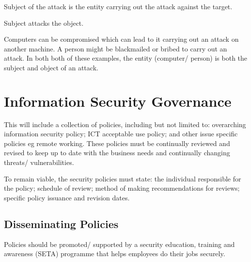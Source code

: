 Subject of the attack is the entity carrying out the attack against the target. 

Subject attacks the object.

Computers can be compromised which can lead to it carrying out an attack on another machine. A person might be blackmailed or bribed to carry out an attack. In both both of these examples, the entity (computer/ person) is both the subject and object of an attack. 

\section*{Information Security Governance}

This will include a collection of policies, including but not limited to: overarching information security policy; ICT acceptable use policy; and other issue specific policies eg remote working. These policies must be continually reviewed and revised to keep up to date with the business needs and continually changing threats/ vulnerabilities.

To remain viable, the security policies must state: the individual responsible for the policy; schedule of review; method of making recommendations for reviews; specific policy issuance and revision dates. 



\subsection*{Disseminating Policies}
Policies should be promoted/ supported by a security education, training and awareness (SETA) programme that helps employees do their jobs securely. 

